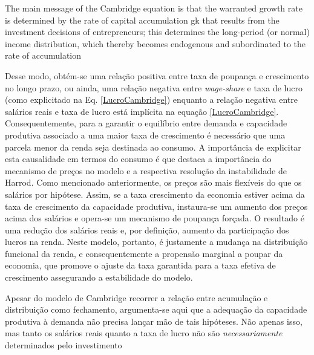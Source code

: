 \begin{citacao}
The main message of the Cambridge
equation is that the warranted growth rate is determined by the rate of capital
accumulation gk that results from the investment decisions of entrepreneurs; this
determines the long-period (or normal) income distribution, which thereby
becomes endogenous and subordinated to the rate of accumulation \cite[p.~158]{cesaratto_neo-kaleckian_2015}
\end{citacao}
Desse modo, obtém-se uma relação positiva entre taxa de poupança e crescimento no longo prazo, ou ainda, uma relação negativa entre \textit{wage-share} e taxa de lucro (como explicitado na Eq. \ref{LucroCambridge}) enquanto a relação negativa entre salários reais e taxa de lucro está implícita na equação \ref{LucroCambridge}. Consequentemente, para a garantir o equilíbrio entre demanda e capacidade produtiva associado a uma maior taxa de crescimento é necessário que uma parcela menor da renda seja destinada ao consumo. A importância de explicitar esta causalidade em termos do consumo é que destaca a importância do mecanismo de preços no modelo e a respectiva resolução da instabilidade de Harrod. Como mencionado anteriormente, os preços são mais flexíveis do que os salários por hipótese. Assim, se a taxa crescimento da economia estiver acima da taxa de crescimento da capacidade produtiva, instaura-se um aumento dos preços acima dos salários e opera-se um mecanismo de poupança forçada. O resultado é uma redução dos salários reais e, por definição, aumento da participação dos lucros na renda.  Neste modelo, portanto, é justamente a mudança na distribuição funcional da renda, e consequentemente a propensão marginal a poupar da economia, que promove o ajuste da taxa garantida para a taxa efetiva de crescimento assegurando a estabilidade do modelo.

Apesar do modelo de Cambridge recorrer a relação entre acumulação e distribuição como fechamento, argumenta-se aqui que a adequação da capacidade
produtiva à demanda não precisa lançar mão de tais hipóteses.
Não apenas isso, mas tanto os salários reais quanto a taxa de lucro não são \textit{necessariamente} determinados pelo investimento

